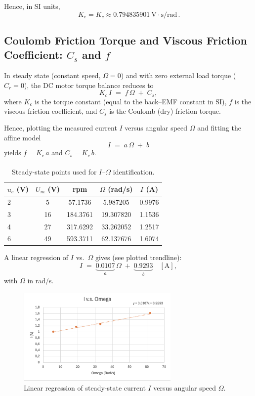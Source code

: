 \documentclass{rapportCS}
\begin{document}
Hence, in SI units,
\[
\boxed{\,K_e = K_c \approx 0.794835901~\text{V}\cdot\text{s/rad}\,}.
\]

\subsection{Coulomb Friction Torque and Viscous Friction Coefficient: $C_s$ and $f$}

In steady state (constant speed, $\dot{\Omega}=0$) and with zero external load torque ($C_r=0$), the DC motor torque balance reduces to
\[
K_c\,I \;=\; f\,\Omega \;+\; C_s ,
\]
where $K_c$ is the torque constant (equal to the back–EMF constant in SI), $f$ is the viscous friction coefficient, and $C_s$ is the Coulomb (dry) friction torque.

Hence, plotting the measured current $I$ versus angular speed $\Omega$ and fitting the affine model
\[
I \;=\; a\,\Omega \;+\; b
\]
yields $f = K_c\,a$ and $C_s = K_c\,b$.

\paragraph{}
\begin{table}[H]
\centering
\caption{Steady-state points used for $I$–$\Omega$ identification.}
\label{tab:friction_data}
\begin{tabular}{lcccc}
\toprule
$u_c$ (V) & $U_m$ (V) & rpm & $\Omega$ (rad/s) & $I$ (A)\\
\midrule
2 & 5  & 57.1736  & 5.987205 & 0.9976 \\
3 & 16 & 184.3761 & 19.307820 & 1.1536 \\
4 & 27 & 317.6292 & 33.262052 & 1.2517 \\
6 & 49 & 593.3711 & 62.137676 & 1.6074 \\
\bottomrule
\end{tabular}
\end{table}

A linear regression of $I$ vs.\ $\Omega$ gives (see plotted trendline):
\[
I \;=\; \underbrace{0.0107}_{a}\,\Omega \;+\; \underbrace{0.9293}_{b}\quad [\mathrm{A}],
\]
with $\Omega$ in rad/s.

\begin{figure}[H]
\centering
\includegraphics[width=0.7\textwidth]{figures/graph_i_omega.png}
\caption{Linear regression of steady-state current $I$ versus angular speed $\Omega$.}
\label{fig:i_omega}
\end{figure}
\end{document}
